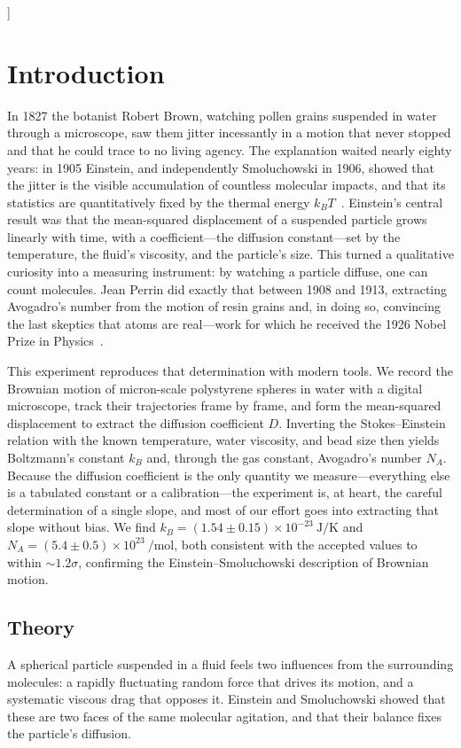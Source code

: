 \documentclass[11pt]{article}
\begin{document}
\vspace{1em}
]

\section{Introduction}
\label{Introduction}
In 1827 the botanist Robert Brown, watching pollen grains suspended in water through
a microscope, saw them jitter incessantly in a motion that never stopped and that he
could trace to no living agency. The explanation waited nearly eighty years: in 1905
Einstein, and independently Smoluchowski in 1906, showed that the jitter is the
visible accumulation of countless molecular impacts, and that its statistics are
quantitatively fixed by the thermal energy $k_B T$~\cite{einstein1905}. Einstein's
central result was that the mean-squared displacement of a suspended particle grows
linearly with time, with a coefficient---the diffusion constant---set by the
temperature, the fluid's viscosity, and the particle's size. This turned a
qualitative curiosity into a measuring instrument: by watching a particle diffuse,
one can count molecules. Jean Perrin did exactly that between 1908 and 1913,
extracting Avogadro's number from the motion of resin grains and, in doing so,
convincing the last skeptics that atoms are real---work for which he received the
1926 Nobel Prize in Physics~\cite{perrin1909}.

This experiment reproduces that determination with modern tools. We record the
Brownian motion of micron-scale polystyrene spheres in water with a digital
microscope, track their trajectories frame by frame, and form the mean-squared
displacement to extract the diffusion coefficient $D$. Inverting the Stokes--Einstein
relation with the known temperature, water viscosity, and bead size then yields
Boltzmann's constant $k_B$ and, through the gas constant, Avogadro's number $N_A$.
Because the diffusion coefficient is the only quantity we measure---everything else
is a tabulated constant or a calibration---the experiment is, at heart, the careful
determination of a single slope, and most of our effort goes into extracting that
slope without bias. We find
$k_B = (1.54\pm0.15)\times10^{-23}~\si{\joule\per\kelvin}$ and
$N_A = (5.4\pm0.5)\times10^{23}~\si{\per\mole}$, both consistent with the accepted
values to within $\sim$$1.2\sigma$, confirming the Einstein--Smoluchowski description
of Brownian motion.

\subsection{Theory}
\label{Theory}
A spherical particle suspended in a fluid feels two influences from the surrounding
molecules: a rapidly fluctuating random force that drives its motion, and a
systematic viscous drag that opposes it. Einstein and Smoluchowski showed that these
are two faces of the same molecular agitation, and that their balance fixes the
particle's diffusion.
\end{document}
